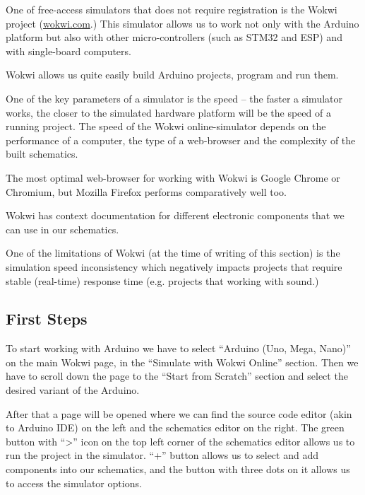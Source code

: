 \documentclass[../sparc.tex]{subfiles}
\begin{document}
One of free-access simulators that does not require registration is the Wokwi
project (\href{https://wokwi.com/}{wokwi.com}.)  This simulator allows us to
work not only with the Arduino platform but also with other micro-controllers
(such as STM32 and ESP) and with single-board computers.

Wokwi allows us quite easily build Arduino projects, program and run them.

One of the key parameters of a simulator is the speed -- the faster a simulator
works, the closer to the simulated hardware platform will be the speed of a
running project.  The speed of the Wokwi online-simulator depends on the
performance of a computer, the type of a web-browser and the complexity of the
built schematics.

The most optimal web-browser for working with Wokwi is Google Chrome or
Chromium, but Mozilla Firefox performs comparatively well too.

Wokwi has context documentation for different electronic components that we can
use in our schematics.

One of the limitations of Wokwi (at the time of writing of this section) is the
simulation speed inconsistency which negatively impacts projects that require
stable (real-time) response time (e.g. projects that working with sound.)

\subsection{First Steps}

To start working with Arduino we have to select ``Arduino (Uno, Mega, Nano)'' on
the main Wokwi page, in the ``Simulate with Wokwi Online'' section.  Then we
have to scroll down the page to the ``Start from Scratch'' section and select
the desired variant of the Arduino.

After that a page will be opened where we can find the source code editor (akin
to Arduino IDE) on the left and the schematics editor on the right.  The green
button with ``>'' icon on the top left corner of the schematics editor allows us
to run the project in the simulator.  ``+'' button allows us to select and add
components into our schematics, and the button with three dots on it allows us
to access the simulator options.
\end{document}
